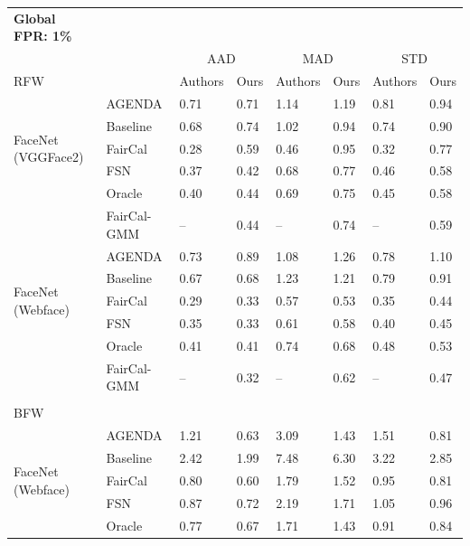 \begin{table}
\footnotesize
\centering
\begin{tabular}{l l ll ll ll}
\toprule
\textbf{Global FPR: 1\%}\\
&& \multicolumn{2}{c}{AAD} & \multicolumn{2}{c}{MAD} & \multicolumn{2}{c}{STD} \\
RFW && Authors & Ours & Authors & Ours & Authors & Ours \\
\midrule
\multirow{5}{5em}{FaceNet (VGGFace2)} 
& AGENDA      &    0.71 &  0.71  &    1.14 &  1.19  &    0.81 &  0.94  \\
& Baseline    &    0.68 &  0.74  &    1.02 &  0.94  &    0.74 &  0.90  \\
& FairCal     &    0.28 &  0.59  &    0.46 &  0.95  &    0.32 &  0.77  \\
& FSN         &    0.37 &  0.42  &    0.68 &  0.77  &    0.46 &  0.58  \\
& Oracle      &    0.40 &  0.44  &    0.69 &  0.75  &    0.45 &  0.58  \\
& FairCal-GMM &     -- &  0.44  &     -- &  0.74  &     -- &  0.59  \\
\hline
\multirow{5}{5em}{FaceNet (Webface)} 
& AGENDA      &    0.73 &  0.89  &    1.08 &  1.26  &    0.78 &  1.10  \\
& Baseline    &    0.67 &  0.68  &    1.23 &  1.21  &    0.79 &  0.91  \\
& FairCal     &    0.29 &  0.33  &    0.57 &  0.53  &    0.35 &  0.44  \\
& FSN         &    0.35 &  0.33  &    0.61 &  0.58  &    0.40 &  0.45  \\
& Oracle      &    0.41 &  0.41  &    0.74 &  0.68  &    0.48 &  0.53  \\
& FairCal-GMM &     -- &  0.32  &     -- &  0.62  &     -- &  0.47  \\
\midrule
\\
BFW & & & & & & &  \\
\midrule
\multirow{5}{5em}{FaceNet (Webface)} 
& AGENDA      &    1.21 &  0.63  &    3.09 &  1.43  &    1.51 &  0.81  \\
& Baseline    &    2.42 &  1.99  &    7.48 &  6.30  &    3.22 &  2.85  \\
& FairCal     &    0.80 &  0.60  &    1.79 &  1.52  &    0.95 &  0.81  \\
& FSN         &    0.87 &  0.72  &    2.19 &  1.71  &    1.05 &  0.96  \\
& Oracle      &    0.77 &  0.67  &    1.71 &  1.43  &    0.91 &  0.84  \\

\end{tabular}
\end{table}
